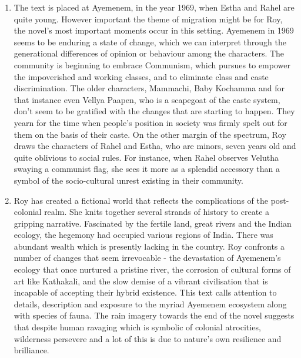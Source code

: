 \begin{enumerate}
  \item The text is placed at Ayemenem, in the year 1969, when Estha and Rahel are quite young. However important the theme of migration might be for Roy, the novel’s most important moments occur in this setting. Ayemenem in 1969 seems to be enduring a state of change, which we can interpret through the generational differences of opinion or behaviour among the characters. The community is beginning to embrace Communism, which pursues to empower the impoverished and working classes, and to eliminate class and caste discrimination. The older characters, Mammachi, Baby Kochamma and for that instance even Vellya Paapen, who is a scapegoat of the caste system, don’t seem to be gratified with the changes that are starting to happen. They yearn for the time when people’s position in society was firmly spelt out for them on the basis of their caste. On the other margin of the spectrum, Roy draws the characters of Rahel and Estha, who are minors, seven years old and quite oblivious to social rules. For instance, when Rahel observes Velutha swaying a communist flag, she sees it more as a splendid accessory than a symbol of the socio-cultural unrest existing in their community.

  \item Roy has created a fictional world that reflects the complications of the post-colonial realm.  She knits together several strands of history to create a gripping narrative.  Fascinated by the fertile land, great rivers and the Indian ecology, the hegemony had occupied various regions of India. There was abundant wealth which is presently lacking in the country.  Roy confronts a number of changes that seem irrevocable - the devastation of Ayemenem’s ecology that once nurtured a pristine river, the corrosion of cultural forms of art like Kathakali, and the slow demise of a vibrant civilisation that is incapable of accepting their hybrid existence.  This text calls attention to details, description and exposure to the myriad Ayemenem ecosystem along with species of fauna. The rain imagery towards the end of the novel suggests that despite human ravaging which is symbolic of colonial atrocities, wilderness persevere and a lot of this is due to nature’s own resilience and brilliance.


\end{enumerate}
